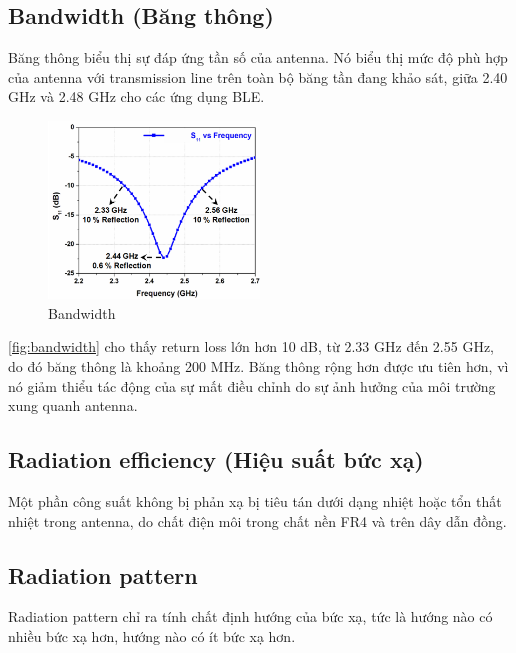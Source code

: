         \subsection{Bandwidth (Băng thông)}
            Băng thông biểu thị sự đáp ứng tần số của antenna.
            Nó biểu thị mức độ phù hợp của antenna với transmission line trên toàn bộ băng tần
            đang khảo sát, giữa 2.40 GHz và 2.48 GHz cho các ứng dụng BLE.\par

            \begin{figure}[h]
                \centering
                \includegraphics[width=0.5\textwidth]{figures/bandwidth.png}
                \caption{Bandwidth}
                \label{fig:bandwidth}
            \end{figure}

            \autoref{fig:bandwidth} cho thấy return loss lớn hơn 10 dB,
            từ 2.33 GHz đến 2.55 GHz, do đó băng thông là khoảng 200 MHz.
            Băng thông rộng hơn được ưu tiên hơn, vì nó giảm thiểu tác động của
            sự mất điều chỉnh do sự ảnh hưởng của môi trường xung quanh antenna.\par

        \subsection{Radiation efficiency (Hiệu suất bức xạ)}
            Một phần công suất không bị phản xạ bị tiêu tán dưới dạng nhiệt
            hoặc tổn thất nhiệt trong antenna, do chất điện môi trong chất nền FR4 và trên dây dẫn đồng.\par    

        \subsection{Radiation pattern}
            Radiation pattern chỉ ra tính chất định hướng của bức xạ,
            tức là hướng nào có nhiều bức xạ hơn, hướng nào có ít bức xạ hơn.\par
            
